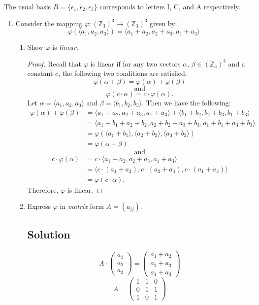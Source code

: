 \documentclass[12pt]{amsart}
\begin{document}
\begin{enumerate}
The usual basis $B = \{\epsilon_1, \epsilon_2, \epsilon_3 \}$ corresponds to letters I, C, and A respectively.

\begin{enumerate}\setlength{\itemsep}{6pt}

\item Consider the mapping $\varphi : (\mathbb Z_3 )^3 \to (\mathbb Z_3 )^3$ given by:
\[\varphi\left(\langle a_1, a_2, a_3 \rangle\right) = \langle a_1+a_2, a_2+a_3, a_1+a_3 \rangle \]

\begin{enumerate}\setlength{\itemsep}{6pt}

\item Show $\varphi$ is {\it linear}.
\begin{proof}
Recall that $\varphi$ is linear if for any two vectors $\alpha,\,\beta \in (\mathbb Z_3 )^3$ and a constant $c$, the following two conditions are satisfied:
\[ \varphi( \alpha + \beta) = \varphi(\alpha) + \varphi(\beta) \]
\[ \textrm{and} \]
\[ \varphi(c\cdot\alpha) = c\cdot\varphi(\alpha). \]
Let $\alpha = \langle a_1, a_2, a_3 \rangle$ and $\beta = \langle b_1, b_2, b_3 \rangle$. Then we have the following:
\begin{align*}
\varphi(\alpha) + \varphi(\beta) &= \langle a_1 + a_2, a_2 + a_3, a_1 + a_3 \rangle +
\langle b_1 + b_2, b_2 + b_3, b_1 + b_3 \rangle \\
&= \langle a_1 + b_1 + a_2 + b_2, a_2 + b_2 + a_3 + b_3, a_1 + b_1 + a_3 + b_3 \rangle \\
&= \varphi(\langle a_1 + b_1 \rangle, \langle a_2 + b_2 \rangle, \langle a_3 + b_3 \rangle) \\
&= \varphi(\alpha + \beta)
\end{align*}
\[ \textrm{and} \]
\begin{align*}
c \cdot \varphi(\alpha) &= c \cdot \langle a_1 + a_2, a_2 + a_3, a_1 + a_3 \rangle \\
&= \langle c\cdot(a_1 + a_2), c\cdot(a_2 + a_3), c\cdot(a_1 + a_3) \rangle \\
&= \varphi(c\cdot\alpha).
\end{align*}
Therefore, $\varphi$ is linear.
\end{proof}

\item Express $\varphi$ in {\it matrix} form $A=(a_{ij})$.
\subsection*{Solution}
\[ A \cdot \begin{pmatrix} a_1 \\ a_2 \\ a_3 \end{pmatrix}
= \begin{pmatrix} a_1 + a_2 \\ a_2 + a_3 \\ a_1 + a_3 \end{pmatrix} \]
\[ A = \begin{pmatrix} 1&1&0 \\ 0&1&1 \\ 1&0&1 \end{pmatrix} \]


\end{enumerate}
\end{enumerate}
\end{enumerate}
\end{document}

